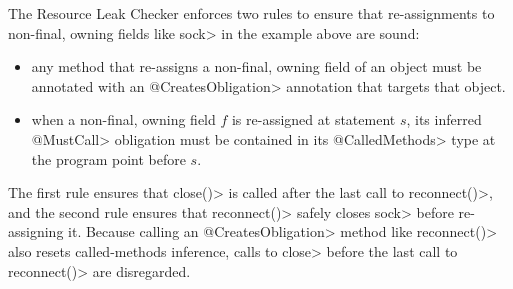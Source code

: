 The Resource Leak Checker enforces two rules to ensure that
re-assignments to non-final, owning fields like \<sock> in the example
above are sound:
\begin{itemize}
\item any method that re-assigns a non-final, owning field of an object
  must be annotated with an \<@CreatesObligation> annotation
  that targets that object.
\item when a non-final, owning field $f$ is re-assigned at statement $s$,
  its inferred \<@MustCall> obligation must be contained in its \<@CalledMethods>
  type at the program point before $s$.
\end{itemize}
\noindent
The first rule ensures that \<close()> is called after the last call
to \<reconnect()>, and the second rule ensures that \<reconnect()>
safely closes \<sock> before re-assigning it. Because calling
an \<@CreatesObligation> method like \<reconnect()> also resets called-methods
inference, calls to \<close> before the last call to \<reconnect()>
are disregarded.


